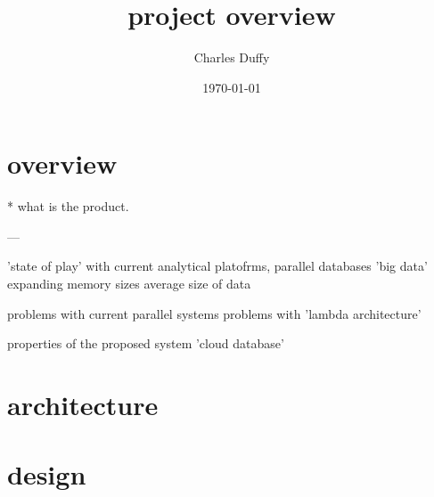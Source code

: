 \documentclass[12pt]{article}
\title{project overview}
\author{Charles Duffy}
\date{\today}
\begin{document}
\maketitle
\section{overview} %

* what is the product. 




---

'state of play' with current analytical platofrms, parallel databases
'big data'
expanding memory sizes
average size of data 

problems with current parallel systems
problems with 'lambda architecture'

properties of the proposed system
'cloud database'


\section{architecture}
\section{design}
\end{document}
